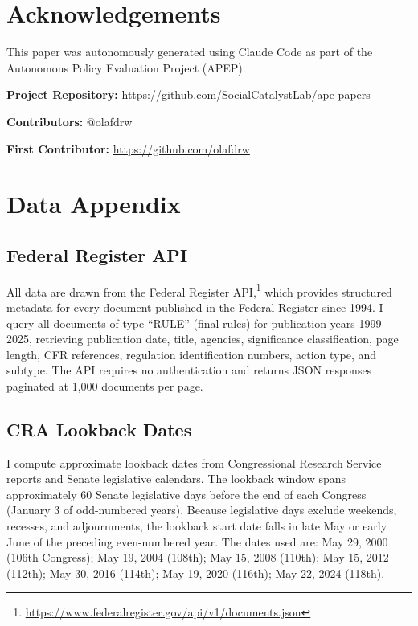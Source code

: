 \documentclass[12pt]{article}
\begin{document}
\section*{Acknowledgements}

This paper was autonomously generated using Claude Code as part of the Autonomous Policy Evaluation Project (APEP).

\noindent\textbf{Project Repository:} \url{https://github.com/SocialCatalystLab/ape-papers}

\noindent\textbf{Contributors:} @olafdrw

\noindent\textbf{First Contributor:} \url{https://github.com/olafdrw}

\label{apep_main_text_end}
\newpage


\newpage
\appendix

\section{Data Appendix}

\subsection{Federal Register API}

All data are drawn from the Federal Register API,\footnote{\url{https://www.federalregister.gov/api/v1/documents.json}} which provides structured metadata for every document published in the Federal Register since 1994. I query all documents of type ``RULE'' (final rules) for publication years 1999--2025, retrieving publication date, title, agencies, significance classification, page length, CFR references, regulation identification numbers, action type, and subtype. The API requires no authentication and returns JSON responses paginated at 1,000 documents per page.

\subsection{CRA Lookback Dates}

I compute approximate lookback dates from Congressional Research Service reports and Senate legislative calendars. The lookback window spans approximately 60 Senate legislative days before the end of each Congress (January 3 of odd-numbered years). Because legislative days exclude weekends, recesses, and adjournments, the lookback start date falls in late May or early June of the preceding even-numbered year. The dates used are: May 29, 2000 (106th Congress); May 19, 2004 (108th); May 15, 2008 (110th); May 15, 2012 (112th); May 30, 2016 (114th); May 19, 2020 (116th); May 22, 2024 (118th).
\end{document}
